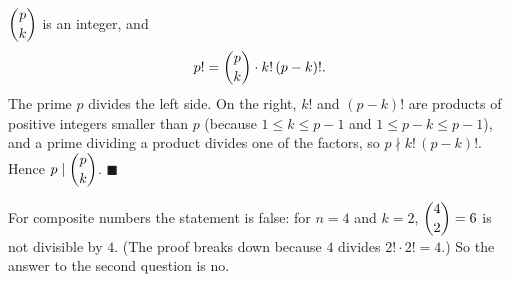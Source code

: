 $\dbinom pk$ is an integer, and
\[
p!=\dbinom pk\cdot k!\,(p-k)! .
\]
The prime $p$ divides the left side. On the right, $k!$ and $(p-k)!$ are products of positive integers smaller than $p$ (because $1\le k\le p-1$ and $1\le p-k\le p-1$), and a prime dividing a product divides one of the factors, so $p\nmid k!\,(p-k)!$. Hence $p\mid\dbinom pk$. $\blacksquare$

For composite numbers the statement is false: for $n=4$ and $k=2$, $\dbinom42=6$ is not divisible by $4$. (The proof breaks down because $4$ divides $2!\cdot2!=4$.) So the answer to the second question is $\boxed{\text{no}}$.
